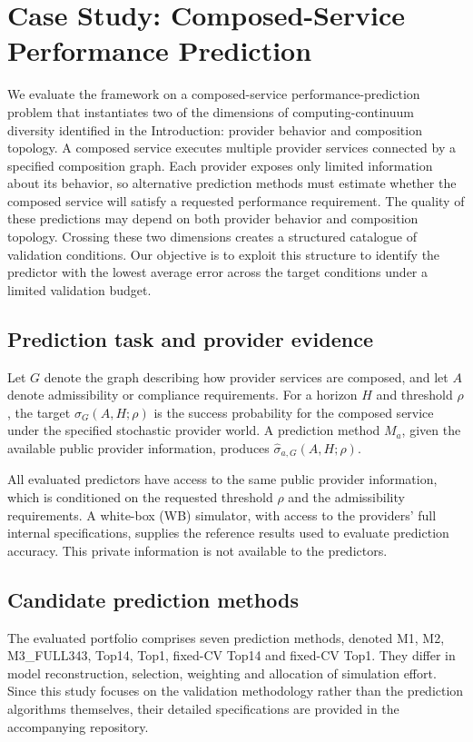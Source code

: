 \documentclass[10pt,a4paper]{article}
\begin{document}
\section{Case Study: Composed-Service Performance Prediction}
\label{sec:case}
We evaluate the framework on a composed-service performance-prediction problem that instantiates two of the dimensions of computing-continuum diversity identified in the Introduction: provider behavior and composition topology. A composed service executes multiple provider services connected by a specified composition graph. Each provider exposes only limited information about its behavior, so alternative prediction methods must estimate whether the composed service will satisfy a requested performance requirement. The quality of these predictions may depend on both provider behavior and composition topology. Crossing these two dimensions creates a structured catalogue of validation conditions. Our objective is to exploit this structure to identify the predictor with the lowest average error across the target conditions under a limited validation budget.


\subsection{Prediction task and provider evidence}
Let $G$ denote the graph describing how provider services
are composed, and let $A$ denote admissibility or compliance
requirements. For a horizon $H$ and threshold $\rho$,
the target $\sigma_G(A,H;\rho)$ is the success probability
for the composed service under the specified stochastic
provider world. A prediction method $M_a$, given the
available public provider information, produces
$\hat{\sigma}_{a,G}(A,H;\rho)$.

All evaluated predictors have access to the same public
provider information, which is conditioned on the requested
threshold $\rho$ and the admissibility requirements.
A white-box (WB) simulator, with access to the providers'
full internal specifications, supplies the reference
results used to evaluate prediction accuracy.
This private information is not available to the predictors.


\subsection{Candidate prediction methods}
The evaluated portfolio comprises seven prediction methods,
denoted M1, M2, M3\_FULL343, Top14, Top1, fixed-CV Top14
and fixed-CV Top1. They differ in model reconstruction,
selection, weighting and allocation of simulation effort.
Since this study focuses on the validation methodology
rather than the prediction algorithms themselves, their
detailed specifications are provided in the accompanying
repository.
\end{document}
